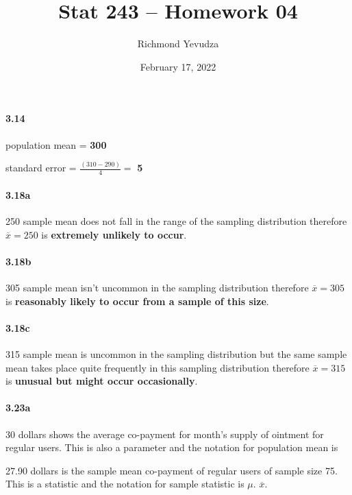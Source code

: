 \documentclass[
]{article}
\title{Stat 243 -- Homework 04}
\author{Richmond Yevudza}
\date{February 17, 2022}
\begin{document}
\maketitle

\hypertarget{section}{%
\paragraph{3.14}\label{section}}

population mean = \textbf{300}

standard error = \(\frac{(310-290)}{4}=\) \textbf{5}

\hypertarget{a}{%
\paragraph{3.18a}\label{a}}

250 sample mean does not fall in the range of the sampling distribution
therefore \(\overline{x} = 250\) is \textbf{extremely unlikely to
occur}.

\hypertarget{b}{%
\paragraph{3.18b}\label{b}}

305 sample mean isn't uncommon in the sampling distribution therefore
\(\overline{x} = 305\) is \textbf{reasonably likely to occur from a
sample of this size}.

\hypertarget{c}{%
\paragraph{3.18c}\label{c}}

315 sample mean is uncommon in the sampling distribution but the same
sample mean takes place quite frequently in this sampling distribution
therefore \(\overline{x} = 315\) is \textbf{unusual but might occur
occasionally}.

\hypertarget{a-1}{%
\paragraph{3.23a}\label{a-1}}

30 dollars shows the average co-payment for month's supply of ointment
for regular users. This is also a parameter and the notation for
population mean is

27.90 dollars is the sample mean co-payment of regular users of sample
size 75. This is a statistic and the notation for sample statistic is
\(\mu\). \(\overline{x}\).
\end{document}
